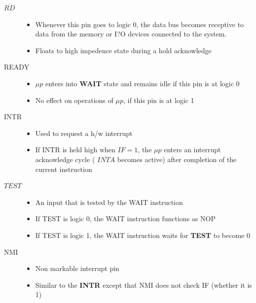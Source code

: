 \documentclass{article}
\begin{document}
\begin{description}
    \item[$\overline{RD}$]
    \begin{itemize}
        \item  Whenever this pin goes to logic 0, the data bus becomes receptive to data from the memory or I?O devices
            connected to the system.
        \item Floats to high impedence state during a hold acknowledge
    \end{itemize}

    \item[READY]
    \begin{itemize}
        \item $\mu p$ enters into \textbf{WAIT} state and remains idle if this pin is at logic 0
        \item No effect on operations of $\mu p$, if this pin is at logic 1
    \end{itemize}


    \item[INTR]
    \begin{itemize}
        \item  Used to request a h/w interrupt
        \item  If INTR is held high when $IF = 1$, the $\mu p$ enters an interrupt acknowledge cycle
        ( $\overline{INTA}$ becomes active) after completion of the current instruction
    \end{itemize}

    \item[$\overline{TEST}$]
    \begin{itemize}
        \item  An input that is tested by the WAIT instruction
        \item  If TEST is logic 0, the WAIT instruction functions as NOP
        \item If TEST is logic 1, the WAIT instruction waits for \textbf{TEST} to become 0
    \end{itemize}

   \item[NMI]
   \begin{itemize}
       \item Non markable interrupt pin
       \item Similar to the \textbf{INTR} except that NMI does not check IF (whether it is 1)

   \end{itemize}


\end{description}
\end{document}

